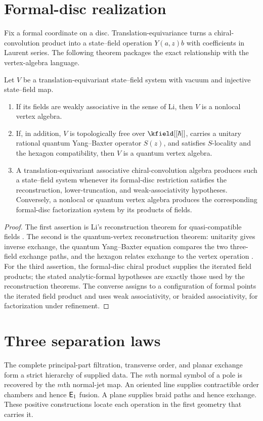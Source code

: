 \section{Formal-disc realization}
Fix a formal coordinate on a disc.  Translation-equivariance turns a chiral-convolution product into a state--field operation $Y(a,z)b$ with coefficients in Laurent series.  The following theorem packages the exact relationship with the vertex-algebra language.

\begin{theorem}
Let $V$ be a translation-equivariant state--field system with vacuum and injective state--field map.
\begin{enumerate}
\item If its fields are weakly associative in the sense of Li, then $V$ is a nonlocal vertex algebra.
\item If, in addition, $V$ is topologically free over $\kfield[[\hbar]]$, carries a unitary rational quantum Yang--Baxter operator $S(z)$, and satisfies $S$-locality and the hexagon compatibility, then $V$ is a quantum vertex algebra.
\item A translation-equivariant associative chiral-convolution algebra produces such a state--field system whenever its formal-disc restriction satisfies the reconstruction, lower-truncation, and weak-associativity hypotheses.  Conversely, a nonlocal or quantum vertex algebra produces the corresponding formal-disc factorization system by its products of fields.
\end{enumerate}
\end{theorem}
\begin{proof}
The first assertion is Li's reconstruction theorem for quasi-compatible fields \cite{LiNonlocal}.  The second is the quantum-vertex reconstruction theorem: unitarity gives inverse exchange, the quantum Yang--Baxter equation compares the two three-field exchange paths, and the hexagon relates exchange to the vertex operation \cite{LiQVA,DSGKQVA}.  For the third assertion, the formal-disc chiral product supplies the iterated field products; the stated analytic-formal hypotheses are exactly those used by the reconstruction theorems.  The converse assigns to a configuration of formal points the iterated field product and uses weak associativity, or braided associativity, for factorization under refinement.
\end{proof}

\section{Three separation laws}
The complete principal-part filtration, transverse order, and planar exchange form a strict hierarchy of supplied data.  The $m$th normal symbol of a pole is recovered by the $m$th normal-jet map.  An oriented line supplies contractible order chambers and hence $\mathsf E_1$ fusion.  A plane supplies braid paths and hence exchange.  These positive constructions locate each operation in the first geometry that carries it.

